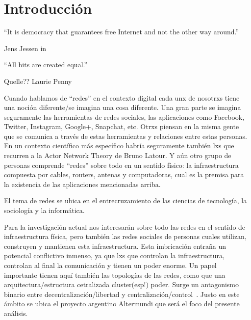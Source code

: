 \section{Introducción}

\epigraph{``It is democracy that guarantees free Internet and not the other way around.''}{Jens Jessen in~\autocite{Rieder2012}}
\epigraph{``All bits are created equal.''}{Quelle?? Laurie Penny~\autocite[69]{Penny2014}}


Cuando hablamos de ``redes'' en el contexto digital cada unx de nosotrxs tiene una noción diferente/se imagina una cosa diferente.
Una gran parte se imagina seguramente las herramientas de redes sociales, las aplicaciones como Facebook, Twitter, Instagram, Google+, Snapchat, etc.
Otrxs piensan en la misma gente que se comunica a través de estas herramientas y relaciones entre estas personas.
En un contexto científico más específico habría seguramente también lxs que recurren a la Actor Network Theory de Bruno Latour.
Y aún otro grupo de personas comprende ``redes'' sobre todo en un sentido físico: la infraestructura compuesta por cables, routers, antenas y computadoras, cual es la premisa para la existencia de las aplicaciones mencionadas arriba.


El tema de redes se ubica en el entrecruzamiento de las ciencias de tecnología, la sociología y la informática.

\begin{comment}
por qué es importante/interesante?
	\item Erläutern Sie kurz, in welchem Themenbereich Ihre Arbeit angesiedelt ist. Wo werden Sie einen Beitrag leisten?
	\item Das Ziel sollte es sein, den groben Kontext Ihrer Arbeit darzustellen.

Política digital <-- Gabriella Coleman heranziehen

\end{comment}



Para la investigación actual nos interesarán sobre todo las redes en el sentido de infraestructura física, pero también las redes sociales de personas cuales utilizan, construyen y mantienen esta infraestructura.
Esta imbricación entraña un potencial conflictivo inmenso, ya que lxs que controlan la infraestructura, controlan al final la comunicación y tienen un poder enorme.
Un papel importante tienen aquí también las topologías de las redes, como que una arquitectura/estructura cetralizada cluster(esp!) poder.
Surge un antagonismo binario entre decentralización/libertad y centralización/control~\autocite{FiTre2015}.
Justo en este ámbito se ubica el proyecto argentino Altermundi que será el foco del presente análisis.

